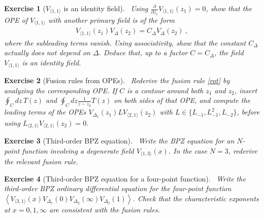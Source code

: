 \documentclass[12pt, a4paper, notitlepage, twoside]{report}
\numberwithin{equation}{section}
\theoremstyle{break}
\newtheorem{exo}{Exercise}[chapter]
\begin{document}
\begin{exo}[$V_{\langle 1,1\rangle}$ is an identity field]
~\label{exoid}
Using $\frac{\partial}{\partial z_1} V_{\langle 1,1\rangle}(z_1)=0$, show that the OPE of $V_{\langle 1,1\rangle}$ with another primary field is of the form 
\begin{align}
 V_{\langle 1,1\rangle}(z_1)V_\Delta(z_2) = C_\Delta V_\Delta(z_2)\ ,
\end{align}
where the subleading terms vanish. Using associativity, show that the constant $C_\Delta$ actually does not depend on $\Delta$. Deduce that, up to a factor $C=C_\Delta$, the field $V_{\langle 1,1\rangle}$ is an identity field.
\end{exo}

\begin{exo}[Fusion rules from OPEs]
 ~\label{exooit}
Rederive the fusion rule \eqref{rot} by analyzing the corresponding OPE.
If $C$ is a contour around both $z_1$ and $z_2$, insert $\oint_C dz\, T(z)$ and $\oint_C dz \frac{1}{z-z_2}T(z)$ on both sides of that OPE, and compute the leading terms of the OPEs $V_{\Delta_1}(z_1) LV_{\langle 2,1 \rangle}(z_2)$ with $L\in\{L_{-1},L_{-1}^2,L_{-2}\}$, before using $L_{\langle 2,1 \rangle} V_{\langle 2,1 \rangle} (z_2) =0$. 
\end{exo}


\begin{exo}[Third-order BPZ equation]
 ~\label{exotob}
 Write the BPZ equation for an $N$-point function involving a degenerate field $V_{\langle 1,3 \rangle}(x)$.
In the case $N=3$, rederive the relevant fusion rule.
\end{exo}

\begin{exo}[Third-order BPZ equation for a four-point function]
 ~\label{exotbf}
 Write the third-order BPZ ordinary differential equation for the four-point function $\left\langle V_{\langle 3,1 \rangle}(x)V_{\Delta_1}(0)V_{\Delta_2}(\infty)V_{\Delta_3}(1)\right\rangle $.
Check that the characteristic exponents at $x=0,1,\infty$ are consistent with the fusion rules. 
\end{exo}
\end{document}

